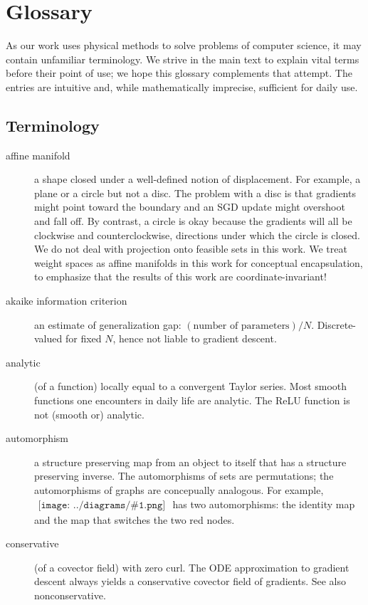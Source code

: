 \documentclass{article}
\theoremstyle{plain}
\theoremstyle{definition}
\newcommand{\sdia}[1]{\begin{gathered}\texttt{[image: ../diagrams/\#1.png]}\end{gathered}}
\begin{document}
\section{Glossary}\label{sect:glossary}

    As our work uses physical methods to solve problems of computer science, it
    may contain unfamiliar terminology.  We strive in the main text to explain
    vital terms before their point of use; we hope this glossary complements
    that attempt.  The entries are intuitive and, while mathematically
    imprecise, sufficient for daily use.

    \subsection{Terminology}

    \begin{description}
        \item[affine manifold] a shape closed under a well-defined notion of displacement.  For example, a plane or a circle but not a disc.  The problem with a disc is that gradients might point toward the boundary and an SGD update might overshoot and fall off.  By contrast, a circle is okay because the gradients will all be clockwise and counterclockwise, directions under which the circle is closed.  We do not deal with projection onto feasible sets in this work.  We treat weight spaces as affine manifolds in this work for conceptual encapsulation, to emphasize that the results of this work are coordinate-invariant! 
        \item[akaike information criterion] an estimate of generalization gap: $(\text{number of parameters})/N$.  Discrete-valued for fixed $N$, hence not liable to gradient descent. 
        \item[analytic] (of a function) locally equal to a convergent Taylor series.  Most smooth functions one encounters in daily life are analytic.  The ReLU function is not (smooth or) analytic. 
        \item[automorphism] a structure preserving map from an object to itself that has a structure preserving inverse.  The automorphisms of sets are permutations; the automorphisms of graphs are concepually analogous.  For example, $\sdia{(01-2)(02-12)}$ has two automorphisms: the identity map and the map that switches the two {\color{moor}red} nodes.   
        \item[conservative] (of a covector field) with zero curl.  The ODE approximation to gradient descent always yields a conservative covector field of gradients.  See also nonconservative. 

\end{description}
\end{document}
